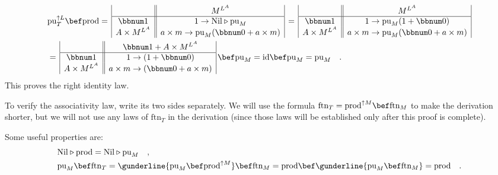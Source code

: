 \begin{align*}
 & \text{pu}_{T}^{\uparrow L}\bef\text{prod}=\,\begin{array}{|c||c|}
 & M^{L^{A}}\\
\hline \bbnum 1 & 1\rightarrow\text{Nil}\triangleright\text{pu}_{M}\\
A\times M^{L^{A}} & a\times m\rightarrow\text{pu}_{M}(\bbnum 0+a\times m)
\end{array}\,=\,\begin{array}{|c||c|}
 & M^{L^{A}}\\
\hline \bbnum 1 & 1\rightarrow\text{pu}_{M}(1+\bbnum 0)\\
A\times M^{L^{A}} & a\times m\rightarrow\text{pu}_{M}(\bbnum 0+a\times m)
\end{array}\\
 & =\,\begin{array}{|c||c|}
 & \bbnum 1+A\times M^{L^{A}}\\
\hline \bbnum 1 & 1\rightarrow(1+\bbnum 0)\\
A\times M^{L^{A}} & a\times m\rightarrow(\bbnum 0+a\times m)
\end{array}\,\bef\text{pu}_{M}=\text{id}\bef\text{pu}_{M}=\text{pu}_{M}\quad.
\end{align*}
This proves the right identity law.

To verify the associativity law, write its two sides separately. We
will use the formula $\text{ftn}_{T}=\text{prod}^{\uparrow M}\bef\text{ftn}_{M}$
to make the derivation shorter, but we will not use any laws of $\text{ftn}_{T}$
in the derivation (since those laws will be established only after
this proof is complete).

Some useful properties are:
\begin{align*}
 & \text{Nil}\triangleright\text{prod}=\text{Nil}\triangleright\text{pu}_{M}\quad,\\
 & \text{pu}_{M}\bef\text{ftn}_{T}=\gunderline{\text{pu}_{M}\bef\text{prod}^{\uparrow M}}\bef\text{ftn}_{M}=\text{prod}\bef\gunderline{\text{pu}_{M}\bef\text{ftn}_{M}}=\text{prod}\quad.
\end{align*}

